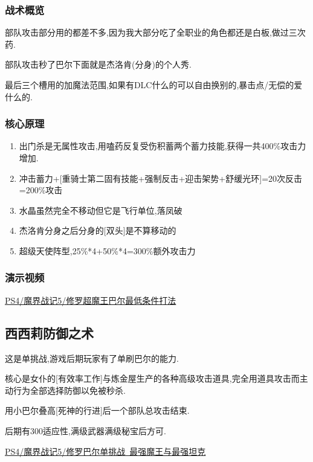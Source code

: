 	\subsubsection{战术概览}

	部队攻击部分用{\color{red}{大魔拳超魔流刷过全职业}}的都差不多,因为我大部分吃了全职业的角色都还是白板,做过三次药.

	部队攻击秒了巴尔下面就是杰洛肯(分身)的个人秀.

	最后三个槽用的加魔法范围,如果有DLC什么的可以自由换别的,暴击点/无偿的爱什么的.

	\newpage

	\subsubsection{核心原理}

	\begin{enumerate}
		\item 出门杀是无属性攻击,用嗑药反复受伤积蓄两个蓄力技能,获得一共400\%攻击力增加.

		\item 冲击蓄力+[重骑士第二固有技能+强制反击+迎击架势+舒缓光环]=20次反击=200\%攻击

		\item 水晶虽然完全不移动但它是飞行单位,落凤破

		\item 杰洛肯分身之后分身的[双头]是不算移动的
		
		\item 超级天使阵型,25\%*4+50\%*4=300\%额外攻击力
	\end{enumerate}

	\subsubsection{演示视频}

	\href{http://www.bilibili.com/video/av2976870/}{PS4/魔界战记5/修罗超魔王巴尔最低条件打法}

	\newpage

	\subsection{西西莉防御之术}

	这是单挑战,游戏后期玩家有了单刷巴尔的能力.

	核心是女仆的[有效率工作]与炼金屋生产的各种高级攻击道具,完全用道具攻击而主动行为全部选择防御以免被秒杀.

	用小巴尔叠高[死神的行进]后一个部队总攻击结束.

	后期有300适应性,满级武器满级秘宝后方可.

	\href{http://www.bilibili.com/video/av3465947/index_2.html}{PS4/魔界战记5/修罗巴尔单挑战~最强魔王与最强坦克}
